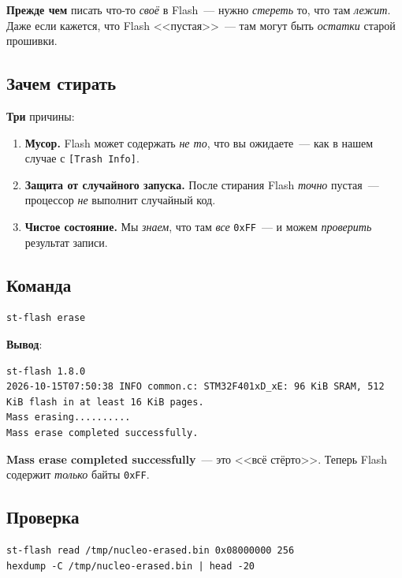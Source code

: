 \textbf{Прежде чем} писать что-то \emph{своё} в Flash~---
нужно \emph{стереть} то, что там \emph{лежит}. Даже если
кажется, что Flash <<пустая>>~--- там могут быть
\emph{остатки} старой прошивки.

\subsection{Зачем стирать}

\textbf{Три} причины:

\begin{enumerate}
    \item \textbf{Мусор.} Flash может содержать \emph{не то},
          что вы ожидаете~--- как в нашем случае
          с \texttt{[Trash Info]}.
    \item \textbf{Защита от случайного запуска.} После
          стирания Flash \emph{точно} пустая~---
          процессор \emph{не} выполнит случайный код.
    \item \textbf{Чистое состояние.} Мы \emph{знаем},
          что там \emph{все} \texttt{0xFF}~--- и
          можем \emph{проверить} результат записи.
\end{enumerate}

\subsection{Команда}

\begin{verbatim}
st-flash erase
\end{verbatim}

\textbf{Вывод}:

\begin{verbatim}
st-flash 1.8.0
2026-10-15T07:50:38 INFO common.c: STM32F401xD_xE: 96 KiB SRAM, 512 KiB flash in at least 16 KiB pages.
Mass erasing..........
Mass erase completed successfully.
\end{verbatim}

\begin{keybox}
\textbf{Mass erase completed successfully}~--- это
<<всё стёрто>>. Теперь Flash содержит \emph{только}
байты \texttt{0xFF}.
\end{keybox}

\subsection{Проверка}

\begin{verbatim}
st-flash read /tmp/nucleo-erased.bin 0x08000000 256
hexdump -C /tmp/nucleo-erased.bin | head -20
\end{verbatim}

